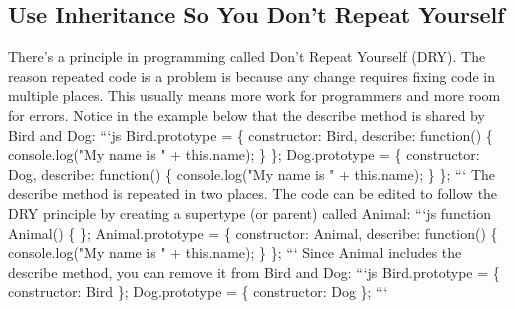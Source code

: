 \documentclass{article}%
\begin{document}
\subsection{Use Inheritance So You Don't Repeat Yourself}%
\label{subsec:UseInheritanceSoYouDontRepeatYourself}%
There's a principle in programming called Don't Repeat Yourself (DRY). The reason repeated code is a problem is because any change requires fixing code in multiple places. This usually means more work for programmers and more room for errors.\newline%
Notice in the example below that the describe method is shared by Bird and Dog:\newline%
```js\newline%
Bird.prototype = \{\newline%
  constructor: Bird,\newline%
  describe: function() \{\newline%
    console.log("My name is " + this.name);\newline%
  \}\newline%
\};\newline%
Dog.prototype = \{\newline%
  constructor: Dog,\newline%
  describe: function() \{\newline%
    console.log("My name is " + this.name);\newline%
  \}\newline%
\};\newline%
```\newline%
The describe method is repeated in two places. The code can be edited to follow the DRY principle by creating a supertype (or parent) called Animal:\newline%
```js\newline%
function Animal() \{ \};\newline%
Animal.prototype = \{\newline%
  constructor: Animal, \newline%
  describe: function() \{\newline%
    console.log("My name is " + this.name);\newline%
  \}\newline%
\};\newline%
```\newline%
Since Animal includes the describe method, you can remove it from Bird and Dog:\newline%
```js\newline%
Bird.prototype = \{\newline%
  constructor: Bird\newline%
\};\newline%
Dog.prototype = \{\newline%
  constructor: Dog\newline%
\};\newline%
```\newline%
\end{document}

